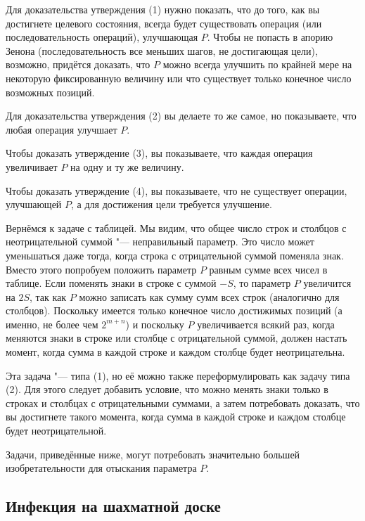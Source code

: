 \documentclass[twoside]{book}
\makeatletter
\newcommand{\rindex}[2][\imki@jobname]{%
\index[#1]{\detokenize{#2}}%
}
\makeatother
\begin{document}
Для доказательства утверждения (1) нужно показать, что до того, как вы достигнете целевого состояния, всегда будет существовать операция (или последовательность операций), улучшающая $P$.
Чтобы не попасть в апорию Зенона (последовательность все меньших
шагов, не достигающая цели), возможно, придётся доказать, что $P$
можно всегда улучшить по крайней мере на некоторую фиксированную величину или что существует только конечное число возможных позиций.

Для доказательства утверждения (2) вы делаете то же самое, но показываете, что любая операция улучшает $P$.

Чтобы доказать утверждение (3), вы показываете, что каждая операция увеличивает $P$ на одну и ту же величину.

Чтобы доказать утверждение (4), вы показываете, что не существует операции, улучшающей $P$, а для достижения цели требуется улучшение.

\medskip

Вернёмся к задаче с таблицей.
Мы видим, что общее число строк и
столбцов с неотрицательной суммой "--- неправильный параметр.
Это
число может уменьшаться даже тогда, когда строка с отрицательной
суммой поменяла знак.
Вместо этого попробуем положить параметр $P$
равным сумме всех чисел в таблице.
Если поменять знаки в строке с
суммой $-S$, то параметр $P$ увеличится на $2S$, так как $P$ можно
записать как сумму сумм всех строк (аналогично для столбцов).
Поскольку имеется только конечное число достижимых позиций (а именно,
не более чем $2^{m+n}$) и поскольку $P$ увеличивается всякий раз,
когда меняются знаки в строке или столбце с отрицательной суммой,
должен настать момент, когда сумма в каждой строке и каждом столбце
будет неотрицательна.

Эта задача "--- типа (1), но её можно также переформулировать как
задачу типа (2).
Для этого следует добавить условие, что можно менять
знаки только в строках и столбцах с отрицательными суммами, а затем
потребовать доказать, что вы достигнете такого момента, когда сумма в
каждой строке и каждом столбце будет неотрицательной.

\medskip

{

Задачи, приведённые ниже, могут потребовать значительно большей изобретательности для отыскания параметра $P$.

}

\subsection*{Инфекция на шахматной доске}%
\rindex{Инфекция на шахматной доске}
\end{document}
